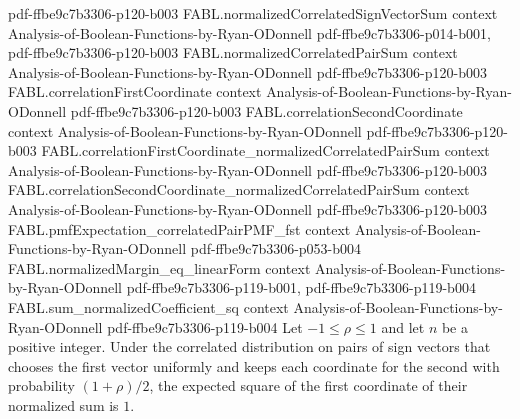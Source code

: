 \begin{theorem}
  {pdf-ffbe9c7b3306-p120-b003}
\proofstep
  {FABL.normalizedCorrelatedSignVectorSum}
  {context}
  {Analysis-of-Boolean-Functions-by-Ryan-ODonnell}
  {pdf-ffbe9c7b3306-p014-b001,
    pdf-ffbe9c7b3306-p120-b003}
\proofstep
  {FABL.normalizedCorrelatedPairSum}
  {context}
  {Analysis-of-Boolean-Functions-by-Ryan-ODonnell}
  {pdf-ffbe9c7b3306-p120-b003}
\proofstep
  {FABL.correlationFirstCoordinate}
  {context}
  {Analysis-of-Boolean-Functions-by-Ryan-ODonnell}
  {pdf-ffbe9c7b3306-p120-b003}
\proofstep
  {FABL.correlationSecondCoordinate}
  {context}
  {Analysis-of-Boolean-Functions-by-Ryan-ODonnell}
  {pdf-ffbe9c7b3306-p120-b003}
\proofstep
  {FABL.correlationFirstCoordinate_normalizedCorrelatedPairSum}
  {context}
  {Analysis-of-Boolean-Functions-by-Ryan-ODonnell}
  {pdf-ffbe9c7b3306-p120-b003}
\proofstep
  {FABL.correlationSecondCoordinate_normalizedCorrelatedPairSum}
  {context}
  {Analysis-of-Boolean-Functions-by-Ryan-ODonnell}
  {pdf-ffbe9c7b3306-p120-b003}
\proofstep
  {FABL.pmfExpectation_correlatedPairPMF_fst}
  {context}
  {Analysis-of-Boolean-Functions-by-Ryan-ODonnell}
  {pdf-ffbe9c7b3306-p053-b004}
\proofstep
  {FABL.normalizedMargin_eq_linearForm}
  {context}
  {Analysis-of-Boolean-Functions-by-Ryan-ODonnell}
  {pdf-ffbe9c7b3306-p119-b001,
    pdf-ffbe9c7b3306-p119-b004}
\proofstep
  {FABL.sum_normalizedCoefficient_sq}
  {context}
  {Analysis-of-Boolean-Functions-by-Ryan-ODonnell}
  {pdf-ffbe9c7b3306-p119-b004}
Let $-1\leq \rho\leq 1$ and let $n$ be a positive integer. Under the correlated
distribution on pairs of sign vectors that chooses the first vector uniformly and keeps
each coordinate for the second with probability $(1+\rho)/2$, the expected square of the
first coordinate of their normalized sum is $1$.
\end{theorem}

